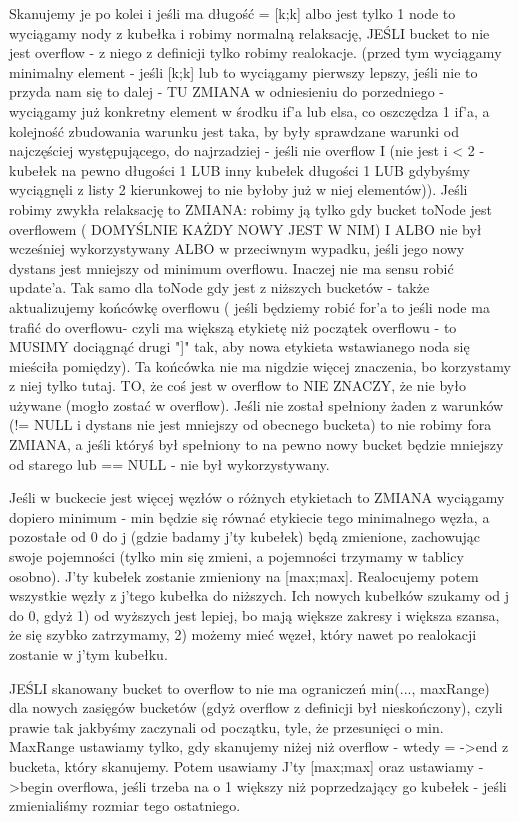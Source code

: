 Skanujemy je po kolei i jeśli ma długość = [k;k] albo jest tylko 1 node to wyciągamy nody z kubełka i robimy normalną relaksację, JEŚLI bucket to nie jest overflow - z niego z definicji tylko robimy realokacje. (przed tym wyciągamy minimalny element - jeśli [k;k] lub to wyciągamy pierwszy lepszy, jeśli nie to przyda nam się to dalej - TU ZMIANA w odniesieniu do porzedniego - wyciągamy już konkretny element w środku if'a lub elsa, co oszczędza 1 if'a, a kolejność zbudowania warunku jest taka, by były sprawdzane warunki od najczęściej występującego, do najrzadziej - jeśli nie overflow I (nie jest i < 2 - kubełek na pewno długości 1 LUB inny kubełek długości 1 LUB gdybyśmy wyciągnęli z listy 2 kierunkowej to nie byłoby już w niej elementów)). Jeśli robimy zwykła relaksację to ZMIANA: robimy ją tylko gdy bucket toNode jest overflowem ( DOMYŚLNIE KAŻDY NOWY JEST W NIM) I ALBO nie był wcześniej wykorzystywany ALBO w przeciwnym wypadku, jeśli jego nowy dystans jest mniejszy od minimum overflowu. Inaczej nie ma sensu robić update'a. Tak samo dla toNode gdy jest z niższych bucketów - także aktualizujemy końcówkę overflowu ( jeśli będziemy robić for'a to jeśli node ma trafić do overflowu- czyli ma większą etykietę niż początek overflowu - to MUSIMY dociągnąć drugi "]" tak, aby nowa etykieta wstawianego noda się mieściła pomiędzy). Ta końcówka nie ma nigdzie więcej znaczenia, bo korzystamy z niej tylko tutaj. TO, że coś jest w overflow to NIE ZNACZY, że nie było używane (mogło zostać w overflow). Jeśli nie został spełniony żaden z warunków (!= NULL i dystans nie jest mniejszy od obecnego bucketa) to nie robimy fora ZMIANA, a jeśli któryś był spełniony to na pewno nowy bucket będzie mniejszy od starego lub == NULL - nie był wykorzystywany.

 Jeśli w buckecie jest więcej węzłów o różnych etykietach to ZMIANA wyciągamy dopiero minimum - min będzie się równać etykiecie tego minimalnego węzła, a pozostałe od 0 do j (gdzie badamy j'ty kubełek) będą zmienione, zachowując swoje pojemności (tylko min się zmieni, a pojemności trzymamy w tablicy osobno). J'ty kubełek zostanie zmieniony na [max;max]. Realocujemy potem wszystkie węzły z j'tego kubełka do niższych. Ich nowych kubełków szukamy od j do 0, gdyż 1) od wyższych jest lepiej, bo mają większe zakresy i większa szansa, że się szybko zatrzymamy, 2) możemy mieć węzeł, który nawet po realokacji zostanie w j'tym kubełku.
 
 JEŚLI skanowany bucket to overflow to nie ma ograniczeń min(..., maxRange) dla nowych zasięgów bucketów (gdyż overflow z definicji był nieskończony), czyli prawie tak jakbyśmy zaczynali od początku, tyle, że przesunięci o min. MaxRange ustawiamy tylko, gdy skanujemy niżej niż overflow - wtedy = ->end z bucketa, który skanujemy. Potem usawiamy J'ty [max;max] oraz ustawiamy ->begin overflowa, jeśli trzeba na o 1 większy niż poprzedzający go kubełek - jeśli zmienialiśmy rozmiar tego ostatniego.
 
